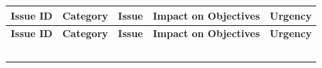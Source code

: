 \documentclass[10pt,letterpaper]{article}
\renewcommand\arraystretch{1.25}
\begin{document}
\begin{center}
\begingroup
\setlength\tabcolsep{2.0pt}
\footnotesize
\renewcommand\arraystretch{1.55}
\begin{longtable}{|>{\raggedright\arraybackslash}p{1.220in}|>{\raggedright\arraybackslash}p{1.220in}|>{\raggedright\arraybackslash}p{1.220in}|>{\raggedright\arraybackslash}p{1.220in}|>{\raggedright\arraybackslash}p{1.220in}|}
\hline
\rowcolor{light}
\textbf{Issue ID} & \textbf{Category} & \textbf{Issue} & \textbf{Impact on Objectives} & \textbf{Urgency} \\ \hline
\endfirsthead
\hline\rowcolor{light} \textbf{Issue ID} & \textbf{Category} & \textbf{Issue} & \textbf{Impact on Objectives} & \textbf{Urgency} \\ \hline
\endhead
\rule{0pt}{11pt}\hspace{0pt} & \rule{0pt}{11pt}\hspace{0pt} & \rule{0pt}{11pt}\hspace{0pt} & \rule{0pt}{11pt}\hspace{0pt} & \rule{0pt}{11pt}\hspace{0pt} \\ \hline
\rule{0pt}{11pt}\hspace{0pt} & \rule{0pt}{11pt}\hspace{0pt} & \rule{0pt}{11pt}\hspace{0pt} & \rule{0pt}{11pt}\hspace{0pt} & \rule{0pt}{11pt}\hspace{0pt} \\ \hline
\rule{0pt}{11pt}\hspace{0pt} & \rule{0pt}{11pt}\hspace{0pt} & \rule{0pt}{11pt}\hspace{0pt} & \rule{0pt}{11pt}\hspace{0pt} & \rule{0pt}{11pt}\hspace{0pt} \\ \hline
\rule{0pt}{11pt}\hspace{0pt} & \rule{0pt}{11pt}\hspace{0pt} & \rule{0pt}{11pt}\hspace{0pt} & \rule{0pt}{11pt}\hspace{0pt} & \rule{0pt}{11pt}\hspace{0pt} \\ \hline
\rule{0pt}{11pt}\hspace{0pt} & \rule{0pt}{11pt}\hspace{0pt} & \rule{0pt}{11pt}\hspace{0pt} & \rule{0pt}{11pt}\hspace{0pt} & \rule{0pt}{11pt}\hspace{0pt} \\ \hline
\end{longtable}
\endgroup
\end{center}
\end{document}
